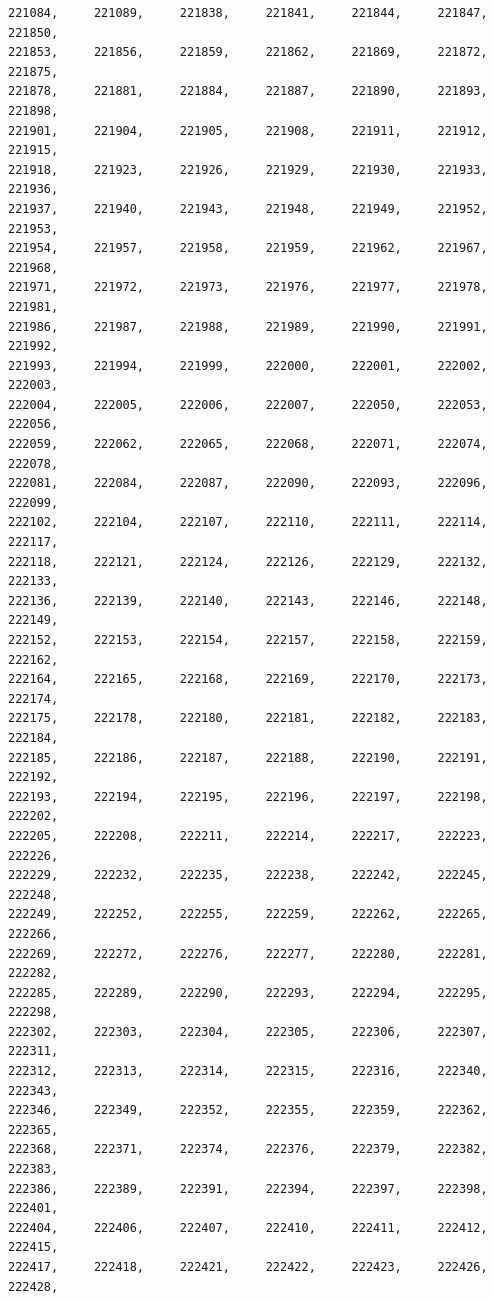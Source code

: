\documentclass[a4paper,11pt]{report}
\begin{document}
\begin{verbatim}
221084,     221089,     221838,     221841,     221844,     221847,     221850,
221853,     221856,     221859,     221862,     221869,     221872,     221875,
221878,     221881,     221884,     221887,     221890,     221893,     221898,
221901,     221904,     221905,     221908,     221911,     221912,     221915,
221918,     221923,     221926,     221929,     221930,     221933,     221936,
221937,     221940,     221943,     221948,     221949,     221952,     221953,
221954,     221957,     221958,     221959,     221962,     221967,     221968,
221971,     221972,     221973,     221976,     221977,     221978,     221981,
221986,     221987,     221988,     221989,     221990,     221991,     221992,
221993,     221994,     221999,     222000,     222001,     222002,     222003,
222004,     222005,     222006,     222007,     222050,     222053,     222056,
222059,     222062,     222065,     222068,     222071,     222074,     222078,
222081,     222084,     222087,     222090,     222093,     222096,     222099,
222102,     222104,     222107,     222110,     222111,     222114,     222117,
222118,     222121,     222124,     222126,     222129,     222132,     222133,
222136,     222139,     222140,     222143,     222146,     222148,     222149,
222152,     222153,     222154,     222157,     222158,     222159,     222162,
222164,     222165,     222168,     222169,     222170,     222173,     222174,
222175,     222178,     222180,     222181,     222182,     222183,     222184,
222185,     222186,     222187,     222188,     222190,     222191,     222192,
222193,     222194,     222195,     222196,     222197,     222198,     222202,
222205,     222208,     222211,     222214,     222217,     222223,     222226,
222229,     222232,     222235,     222238,     222242,     222245,     222248,
222249,     222252,     222255,     222259,     222262,     222265,     222266,
222269,     222272,     222276,     222277,     222280,     222281,     222282,
222285,     222289,     222290,     222293,     222294,     222295,     222298,
222302,     222303,     222304,     222305,     222306,     222307,     222311,
222312,     222313,     222314,     222315,     222316,     222340,     222343,
222346,     222349,     222352,     222355,     222359,     222362,     222365,
222368,     222371,     222374,     222376,     222379,     222382,     222383,
222386,     222389,     222391,     222394,     222397,     222398,     222401,
222404,     222406,     222407,     222410,     222411,     222412,     222415,
222417,     222418,     222421,     222422,     222423,     222426,     222428,

\end{verbatim}
\end{document}
